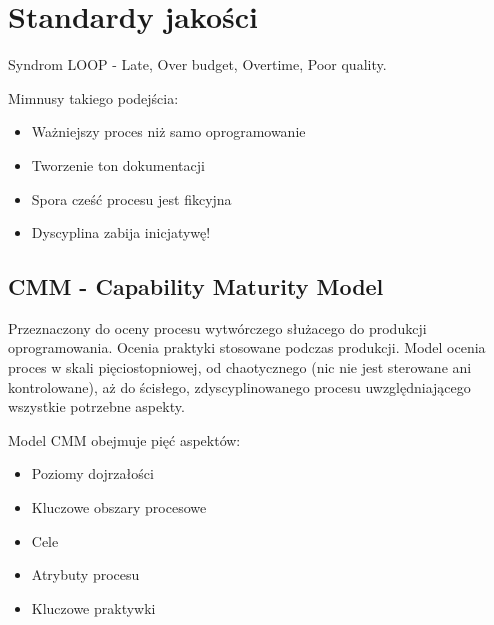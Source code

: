 \documentclass[a4paper]{article}
\begin{document}
\section{Standardy jakości}

Syndrom LOOP - Late, Over budget, Overtime, Poor quality.

Mimnusy takiego podejścia:
\begin{itemize}
    \item Ważniejszy proces niż samo oprogramowanie
    \item Tworzenie ton dokumentacji
    \item Spora cześć procesu jest
    fikcyjna
    \item Dyscyplina zabija
    inicjatywę!
\end{itemize}

\subsection{CMM - Capability Maturity Model}
    Przeznaczony do oceny procesu wytwórczego służacego do produkcji oprogramowania.
    Ocenia praktyki stosowane podczas produkcji.
Model ocenia proces w skali pięciostopniowej, od chaotycznego (nic nie jest
sterowane ani kontrolowane),  aż do ścisłego,
zdyscyplinowanego procesu uwzględniającego wszystkie potrzebne aspekty.

    Model CMM obejmuje pięć aspektów:
    \begin{itemize}
        \item Poziomy dojrzałości
        \item Kluczowe obszary procesowe
        \item Cele
        \item Atrybuty procesu
        \item Kluczowe praktywki
    \end{itemize}
\end{document}

